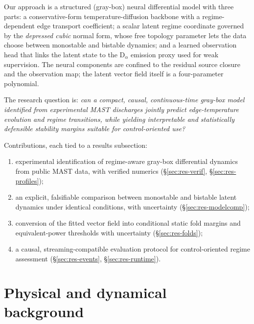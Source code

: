 \documentclass[11pt]{article}
\begin{document}
Our approach is a structured (gray-box) neural differential model with
three parts: a conservative-form temperature-diffusion backbone with a
regime-dependent edge transport coefficient; a scalar latent regime
coordinate governed by the \emph{depressed cubic} normal form, whose free
topology parameter lets the data choose between monostable and bistable
dynamics; and a learned observation head that links the latent state to
the D$_\alpha$ emission proxy used for weak supervision. The neural
components are confined to the residual source closure and the observation
map; the latent vector field itself is a four-parameter polynomial.

The research question is:
\emph{can a compact, causal, continuous-time gray-box model identified
from experimental MAST discharges jointly predict edge-temperature
evolution and regime transitions, while yielding interpretable and
statistically defensible stability margins suitable for control-oriented
use?}

Contributions, each tied to a results subsection:
\begin{enumerate}
\item experimental identification of regime-aware gray-box differential
      dynamics from public MAST data, with verified numerics
      (\S\ref{sec:res-verif}, \S\ref{sec:res-profiles});
\item an explicit, falsifiable comparison between monostable and bistable
      latent dynamics under identical conditions, with uncertainty
      (\S\ref{sec:res-modelcomp});
\item conversion of the fitted vector field into conditional static fold
      margins and equivalent-power thresholds with uncertainty
      (\S\ref{sec:res-folds});
\item a causal, streaming-compatible evaluation protocol for
      control-oriented regime assessment (\S\ref{sec:res-events},
      \S\ref{sec:res-runtime}).
\end{enumerate}

\section{Physical and dynamical background}
\label{sec:physics}
\end{document}
